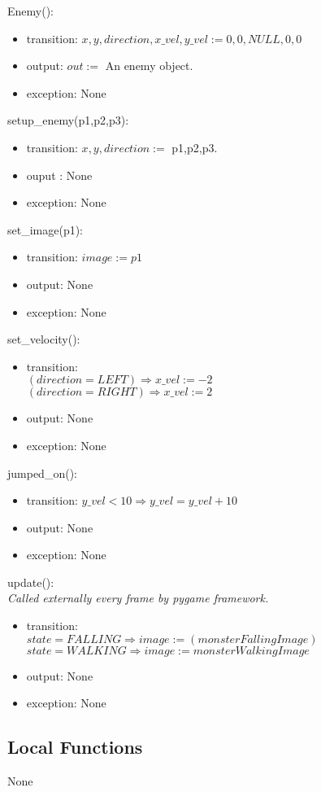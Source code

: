 \documentclass[12pt]{article}
\begin{document}
Enemy():
\begin{itemize}
\item transition: $x, y, direction, x\_vel, y\_vel := 0, 0, NULL, 0, 0 $
\item output: $out := $ An enemy object.
\item exception: None\\
\end{itemize}

\noindent setup\_enemy(p1,p2,p3):
\begin{itemize}
\item transition: $x,y,direction := $ p1,p2,p3.
\item ouput : None
\item exception: None\\
\end{itemize}

\noindent set\_image(p1):
\begin{itemize}
\item transition: $image := p1$
\item output: None
\item exception: None
\end{itemize}

\noindent set\_velocity():
\begin{itemize}
\item transition: 
\\
$ (direction = LEFT) \Rightarrow x\_vel := -2$\\
$ (direction = RIGHT) \Rightarrow x\_vel := 2$\\
\item output: None
\item exception: None
\end{itemize}

\noindent jumped\_on():
\begin{itemize}
\item transition: 
$y\_vel < 10 \Rightarrow y\_vel = y\_vel + 10$
\item output: None
\item exception: None
\end{itemize}

\noindent update():\\
\textit{Called externally every frame by pygame framework.}
\begin{itemize}
\item transition:\\
$state=FALLING \Rightarrow image := (monsterFallingImage)$\\
$state=WALKING \Rightarrow image := monsterWalkingImage$
\item output: None
\item exception: None
\end{itemize}
\subsection*{Local Functions}
None
\newpage
\end{document}
